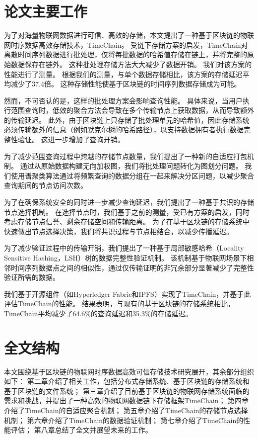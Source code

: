 \section{论文主要工作}
为了对海量物联网数据进行可信、高效的存储，本文提出了一种基于区块链的物联网时序数据高效存储技术，TimeChain。
受链下存储方案的启发，TimeChain对离散时间序列数据进行批处理，仅将每批数据的哈希值存储在链上，并将完整的原始数据保存在链外。
这种批处理存储方法大大减少了数据开销。
我们对该方案的性能进行了测量。
根据我们的测量，与单个数据存储相比，该方案的存储延迟平均减少了37.4倍。
这种存储性能使基于区块链的时间序列数据存储成为可能。

然而，不可否认的是，这样的批处理方案会影响查询性能。
具体来说，当用户执行范围查询时，低效的聚合方法会导致在多个传输节点上获取数据，从而导致额外的传输延迟。
此外，由于区块链上只存储了批处理单元的哈希值，因此存储系统必须传输额外的信息（例如默克尔树的哈希路径），以支持数据拥有者执行数据完整性验证。
这进一步增加了查询开销。

为了减少范围查询过程中跨越的存储节点数量，我们提出了一种新的自适应打包机制。
通过从原始数据构建无向加权图，我们将批处理问题转化为图划分问题。
我们使用谱聚类算法通过将频繁查询的数据分组在一起来解决分区问题，以减少聚合查询期间的节点访问次数。

为了在确保系统安全的同时进一步减少查询延迟，我们提出了一种基于共识的存储节点选择机制。
在选择节点时，我们基于之前的测量，受已有方案的启发，同时考虑存储节点信誉、剩余存储空间和传输距离。
为了在基于区块链的存储系统中快速做出节点选择决策，我们将共识过程与节点相结合，以减少传播延迟。

为了减少验证过程中的传输开销，我们提出了一种基于局部敏感哈希（Locality Sensitive Hashing，LSH）树的数据完整性验证机制。
该机制基于物联网场景下相邻时间序列数据点之间的相似性，通过仅传输证明的非冗余部分显著减少了完整性验证所需的数据。

我们基于开源组件（如Hyperledger Fabric和IPFS）实现了TimeChain，并基于此评估TimeChain的性能。
结果表明，与现有的基于区块链的存储系统相比，TimeChain平均减少了64.6\%的查询延迟和35.3\%的存储延迟。

\section{全文结构}
本文围绕基于区块链的物联网时序数据高效可信存储技术研究展开，其余部分组织如下：
第二章介绍了相关工作，包括分布式存储系统、基于区块链的存储系统和基于区块链的文件系统；
第三章介绍了目前基于区块链的物联网存储系统面临的需求和挑战，并提出了一种高效的物联网数据链下存储框架TimeChain；
第四章介绍了TimeChain的自适应聚合机制；
第五章介绍了TimeChain的存储节点选择机制；
第六章介绍了TimeChain的数据验证机制；
第七章介绍了TimeChain的性能评估；
第八章总结了全文并展望未来的工作。

